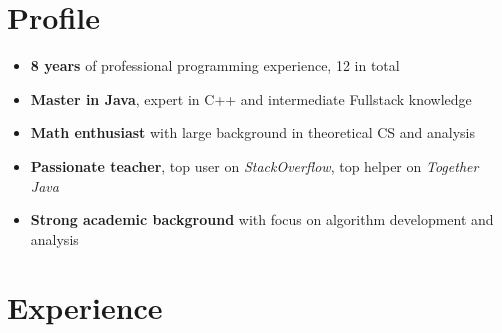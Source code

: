\documentclass[letterpaper]{twentysecondcv} %
\begin{document}
\makesidebarFirst %

\section{Profile}

\begin{itemize}
	\item \textbf{8 years} of professional programming experience, 12 in total
	\item \textbf{Master in Java}, expert in C++ and intermediate Fullstack knowledge
	\item \textbf{Math enthusiast} with large background in theoretical CS and analysis
	\item \textbf{Passionate teacher}, top user on \textit{StackOverflow}, top helper on \textit{Together Java}
	\item \textbf{Strong academic background} with focus on algorithm development and analysis
\end{itemize}

\vspace{6mm}


\section{Experience}
\end{document}
